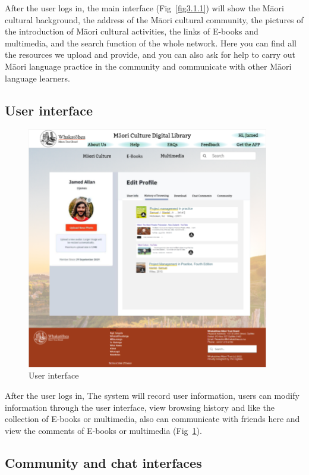 After the user logs in, the main interface (Fig~\ref{fig3.1.1}) will show the Māori cultural background, the address of the Māori cultural community, the pictures of the introduction of Māori cultural activities, the links of E-books and multimedia, and the search function of the whole network. Here you can find all the resources we upload and provide, and you can also ask for help to carry out Māori language practice in the community and communicate with other Māori language learners.

\subsection{User interface}

\begin{figure}[htbp]
  \centerline{\includegraphics[width=300pt]{images/3-1-2.png}}
  \caption{User interface}
  \label{fig3.1.2}
\end{figure}

After the user logs in, The system will record user information, users can modify information through the user interface, view browsing history and like the collection of E-books or multimedia, also can communicate with friends here and view the comments of E-books or multimedia (Fig~\ref{fig3.1.2}).

\subsection{Community and chat interfaces}

